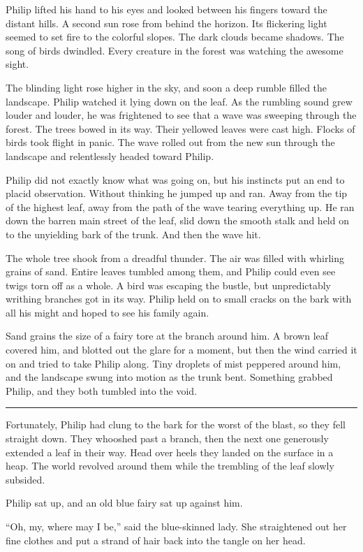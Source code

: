 \documentclass[10pt, draft]{memoir}
\renewcommand{\pfbreakdisplay}{\bigskip \ding{166} \bigskip}
\newcommand{\secbreak}{\fancybreak{\pfbreakdisplay}}
\begin{document}
Philip lifted his hand to his eyes and looked between his fingers toward the
distant hills. A second sun rose from behind the horizon. Its flickering light
seemed to set fire to the colorful slopes. The dark clouds became shadows. The
song of birds dwindled. Every creature in the forest was watching the awesome
sight.

The blinding light rose higher in the sky, and soon a deep rumble filled the
landscape.  Philip watched it lying down on the leaf. As the rumbling sound grew
louder and louder, he was frightened to see that a wave was sweeping through
the forest. The trees bowed in its way. Their yellowed leaves were cast high.
Flocks of birds took flight in panic. The wave rolled out from the new sun
through the landscape and relentlessly headed toward Philip.

Philip did not exactly know what was going on, but his instincts put an end to
placid observation. Without thinking he jumped up and ran. Away from the tip of
the highest leaf, away from the path of the wave tearing everything up.  He ran
down the barren main street of the leaf, slid down the smooth stalk and held on
to the unyielding bark of the trunk. And then the wave hit.

The whole tree shook from a dreadful thunder. The air was filled with whirling
grains of sand. Entire leaves tumbled among them, and Philip could even see
twigs torn off as a whole. A bird was escaping the bustle, but unpredictably
writhing branches got in its way. Philip held on to small cracks on the bark
with all his might and hoped to see his family again.

Sand grains the size of a fairy tore at the branch around him. A brown leaf
covered him, and blotted out the glare for a moment, but then the wind carried
it on and tried to take Philip along. Tiny droplets of mist peppered around
him, and the landscape swung into motion as the trunk bent. Something grabbed
Philip, and they both tumbled into the void.

\secbreak

Fortunately, Philip had clung to the bark for the worst of the blast, so they
fell straight down. They whooshed past a branch, then the next one generously
extended a leaf in their way. Head over heels they landed on the surface in a
heap. The world revolved around them while the trembling of the leaf slowly
subsided.

Philip sat up, and an old blue fairy sat up against him.

``Oh, my, where may I be,'' said the blue-skinned lady. She straightened out
her fine clothes and put a strand of hair back into the tangle on her head.
\end{document}
